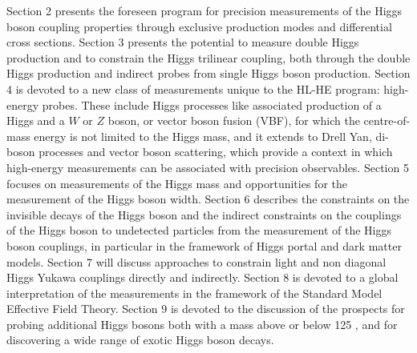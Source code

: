 \documentclass[../report.tex]{subfiles}
\begin{document}
Section 2 presents the foreseen program for precision measurements of
the Higgs boson coupling properties through exclusive production modes
and differential cross sections. Section 3 presents the potential to
measure double Higgs production and to constrain the Higgs
trilinear coupling, both through the double Higgs production and
indirect probes from single Higgs boson production. Section 4 is
devoted to a new class of measurements unique to the HL-HE program:
high-energy probes. These include Higgs processes like  associated production  of a Higgs and a $W$ or $Z$ boson,  or vector boson fusion (VBF), for which the centre-of-mass energy is not limited to the Higgs mass, and it extends to
Drell Yan, di-boson processes and vector
boson scattering, which provide a context in which high-energy measurements can be associated with 
 precision observables. Section 5 focuses on measurements of the
Higgs mass and opportunities for the measurement of the Higgs boson
width. Section 6 describes the constraints on the invisible decays of
the Higgs boson and the indirect constraints on the couplings of the
Higgs boson to undetected particles from the measurement of the Higgs
boson couplings, in particular in the framework of Higgs portal
and dark matter models. Section 7 will discuss approaches to constrain light and non
diagonal Higgs Yukawa couplings directly and indirectly. Section 8 is
devoted to a global interpretation of the measurements in the
framework of the Standard Model Effective Field Theory. Section 9 is
devoted to the discussion of the prospects for probing additional Higgs bosons both with a mass above or below 125 \UGeV, and for discovering a wide range of exotic Higgs boson decays.
\end{document}

